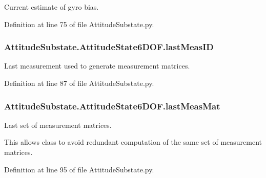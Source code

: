 Current estimate of gyro bias. 



Definition at line 75 of file Attitude\+Substate.\+py.

\subsubsection[{\texorpdfstring{last\+Meas\+ID}{lastMeasID}}]{\setlength{\rightskip}{0pt plus 5cm}Attitude\+Substate.\+Attitude\+State6\+D\+O\+F.\+last\+Meas\+ID}\hypertarget{classAttitudeSubstate_1_1AttitudeState6DOF_a1ea482e5536162f74876d1dd23b12e96}{}\label{classAttitudeSubstate_1_1AttitudeState6DOF_a1ea482e5536162f74876d1dd23b12e96}


Last measurement used to generate measurement matrices. 



Definition at line 87 of file Attitude\+Substate.\+py.

\subsubsection[{\texorpdfstring{last\+Meas\+Mat}{lastMeasMat}}]{\setlength{\rightskip}{0pt plus 5cm}Attitude\+Substate.\+Attitude\+State6\+D\+O\+F.\+last\+Meas\+Mat}\hypertarget{classAttitudeSubstate_1_1AttitudeState6DOF_ae23a47fae330703aa8a50b207275c9b0}{}\label{classAttitudeSubstate_1_1AttitudeState6DOF_ae23a47fae330703aa8a50b207275c9b0}


Last set of measurement matrices. 

This allows class to avoid redundant computation of the same set of measurement matrices. 

Definition at line 95 of file Attitude\+Substate.\+py.

